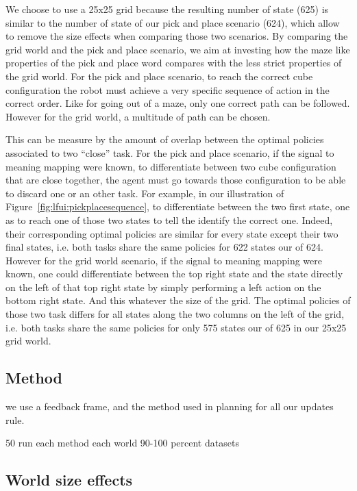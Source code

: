 We choose to use a 25x25 grid because the resulting number of state (625) is similar to the number of state of our pick and place scenario (624), which allow to remove the size effects when comparing those two scenarios. By comparing the grid world and the pick and place scenario, we aim at investing how the maze like properties of the pick and place word compares with the less strict properties of the grid world. For the pick and place scenario, to reach the correct cube configuration the robot must achieve a very specific sequence of action in the correct order. Like for going out of a maze, only one correct path can be followed. However for the grid world, a multitude of path can be chosen. 

This can be measure by the amount of overlap between the optimal policies associated to two ``close'' task. For the pick and place scenario, if the signal to meaning mapping were known, to differentiate between two cube configuration that are close together, the agent must go towards those configuration to be able to discard one or an other task. For example, in our illustration of Figure~\ref{fig:lfui:pickplacesequence}, to differentiate between the two first state, one as to reach one of those two states to tell the identify the correct one. Indeed, their corresponding optimal policies are similar for every state except their two final states, i.e. both tasks share the same policies for 622 states our of 624. However for the grid world scenario, if the signal to meaning mapping were known, one could differentiate between the top right state and the state directly on the left of that top right state by simply performing a left action on the bottom right state. And this whatever the size of the grid. The optimal policies of those two task differs for all states along the two columns on the left of the grid, i.e. both tasks share the same policies for only 575 states our of 625 in our 25x25 grid world.

\subsection{Method}

we use a feedback frame, and the method used in planning for all our updates rule.

50 run each method each world
90-100 percent datasets

\subsection{World size effects}


